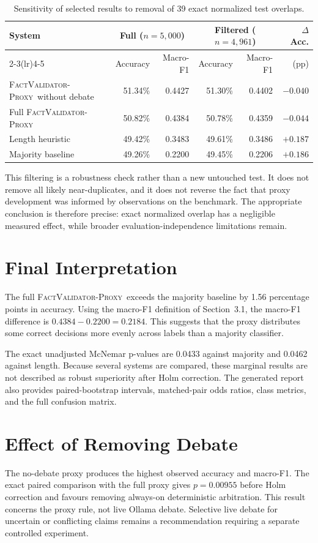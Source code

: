 \documentclass[12pt,a4paper,openany]{report}
\newcommand{\proxy}{\textsc{FactValidator-Proxy}}
\begin{document}
\begin{table}[H]
\centering
\caption{Sensitivity of selected results to removal of 39 exact normalized test overlaps.}
\label{tab:decontaminated}
\small
\begin{tabularx}{\textwidth}{Xrrrrr}
\toprule
System & \multicolumn{2}{c}{Full ($n=5{,}000$)} & \multicolumn{2}{c}{Filtered ($n=4{,}961$)} & $\Delta$ Acc. \\
\cmidrule(lr){2-3}\cmidrule(lr){4-5}
 & Accuracy & Macro-F1 & Accuracy & Macro-F1 & (pp) \\
\midrule
\proxy\ without debate & 51.34\% & 0.4427 & 51.30\% & 0.4402 & $-0.040$ \\
Full \proxy & 50.82\% & 0.4384 & 50.78\% & 0.4359 & $-0.044$ \\
Length heuristic & 49.42\% & 0.3483 & 49.61\% & 0.3486 & $+0.187$ \\
Majority baseline & 49.26\% & 0.2200 & 49.45\% & 0.2206 & $+0.186$ \\
\bottomrule
\end{tabularx}
\end{table}

This filtering is a robustness check rather than a new untouched test. It
does not remove all likely near-duplicates, and it does not reverse the fact
that proxy development was informed by observations on the benchmark. The
appropriate conclusion is therefore precise: exact normalized overlap has a
negligible measured effect, while broader evaluation-independence limitations
remain.

\section{Final Interpretation}
The full \proxy\ exceeds the majority baseline by 1.56 percentage points in accuracy. Using the macro-F1 definition of Section~3.1, the macro-F1 difference is $0.4384 - 0.2200 = 0.2184$. This suggests that the proxy distributes some correct decisions more evenly across labels than a majority classifier.

The exact unadjusted McNemar p-values are 0.0433 against majority and 0.0462 against length. Because several systems are compared, these marginal results are not described as robust superiority after Holm correction. The generated report also provides paired-bootstrap intervals, matched-pair odds ratios, class metrics, and the full confusion matrix.

\section{Effect of Removing Debate}
The no-debate proxy produces the highest observed accuracy and macro-F1. The exact paired comparison with the full proxy gives $p=0.00955$ before Holm correction and favours removing always-on deterministic arbitration. This result concerns the proxy rule, not live Ollama debate. Selective live debate for uncertain or conflicting claims remains a recommendation requiring a separate controlled experiment.
\end{document}
